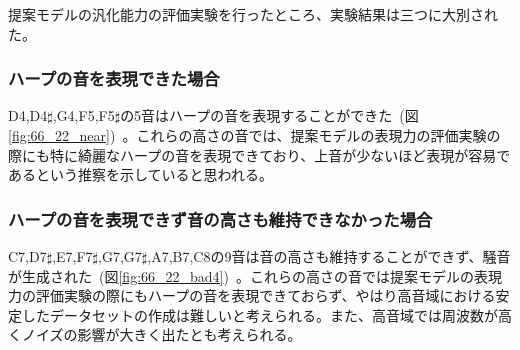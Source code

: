 提案モデルの汎化能力の評価実験を行ったところ、実験結果は三つに大別された。

\subsubsection{ハープの音を表現できた場合}

D4,D4$\sharp$,G4,F5,F5$\sharp$の5音はハープの音を表現することができた~(図\ref{fig:66_22_near})~。これらの高さの音では、提案モデルの表現力の評価実験の際にも特に綺麗なハープの音を表現できており、上音が少ないほど表現が容易であるという推察を示していると思われる。

\subsubsection{ハープの音を表現できず音の高さも維持できなかった場合}

C7,D7$\sharp$,E7,F7$\sharp$,G7,G7$\sharp$,A7,B7,C8の9音は音の高さも維持することができず、騒音が生成された~(図\ref{fig:66_22_bad4})~。これらの高さの音では提案モデルの表現力の評価実験の際にもハープの音を表現できておらず、やはり高音域における安定したデータセットの作成は難しいと考えられる。また、高音域では周波数が高くノイズの影響が大きく出たとも考えられる。

